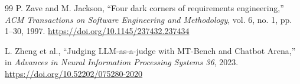 \documentclass[10pt,a4paper]{article}
\begin{document}
\begin{thebibliography}{99}
P. Zave and M. Jackson, ``Four dark corners of requirements engineering,'' \emph{ACM Transactions on Software Engineering and Methodology}, vol. 6, no. 1, pp. 1--30, 1997. \url{https://doi.org/10.1145/237432.237434}

L. Zheng et al., ``Judging LLM-as-a-judge with MT-Bench and Chatbot Arena,'' in \emph{Advances in Neural Information Processing Systems 36}, 2023. \url{https://doi.org/10.52202/075280-2020}

\end{thebibliography}
\end{document}
